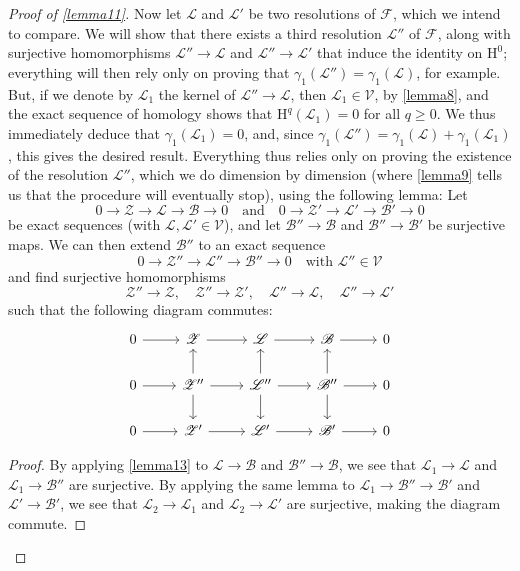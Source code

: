 \documentclass{article}
\theoremstyle{plain}
\newenvironment{lemma}[1]
    {\renewcommand\theinnercustomlemma{#1}\innercustomlemma}
    {\endinnercustomlemma}
\theoremstyle{definition}
\newcommand{\sh}[1]{{\mathscr{#1}}}
\newcommand{\cat}[1]{{\mathcal{#1}}}
\newcommand{\HH}{\mathrm{H}}
\renewcommand{\geq}{\geqslant}
\newcommand{\oldpage}[1]{\marginpar{\footnotesize$\Big\vert$ \textit{p.~#1}}}
\begin{document}
\begin{proof}[Proof of \cref{lemma11}]
  Now let $\sh{L}$ and $\sh{L}'$ be two resolutions of $\sh{F}$, which we intend to compare.
  We will show that there exists a third resolution $\sh{L}''$ of $\sh{F}$, along with surjective homomorphisms $\sh{L}''\to\sh{L}$ and $\sh{L}''\to\sh{L}'$ that induce the identity on $\HH^0$;
  everything will then rely only on proving that $\gamma_1(\sh{L}'')=\gamma_1(\sh{L})$, for example.
  But, if we denote by $\sh{L}_1$ the kernel of $\sh{L}''\to\sh{L}$, then $\sh{L}_1\in\cat{V}$, by \cref{lemma8}, and the exact sequence of homology shows that $\HH^q(\sh{L}_1)=0$ for all $q\geq0$.
  We thus immediately deduce that $\gamma_1(\sh{L}_1)=0$, and, since $\gamma_1(\sh{L}'')=\gamma_1(\sh{L})+\gamma_1(\sh{L}_1)$, this gives the desired result.
  Everything thus relies only on proving the existence of the resolution $\sh{L}''$, which we do dimension by dimension (where \cref{lemma9} tells us that the procedure will eventually stop), using the following lemma:
  \begin{lemma}{14}
  \label{lemma14}
    Let
    \[
      0\to\sh{Z}\to\sh{L}\to\sh{B}\to0
      \quad\text{and}\quad
      0\to\sh{Z}'\to\sh{L}'\to\sh{B}'\to0
    \]
    be exact sequences (with $\sh{L},\sh{L}'\in\cat{V}$), and let $\sh{B}''\to\sh{B}$ and $\sh{B}''\to\sh{B}'$ be surjective maps.
    We can then extend $\sh{B}''$ to an exact sequence
    \[
      0\to\sh{Z}''\to\sh{L}''\to\sh{B}''\to0
      \quad
      \mbox{with $\sh{L}''\in\cat{V}$}
    \]
    and find surjective homomorphisms
    \[
      \sh{Z}''\to\sh{Z},
      \quad
      \sh{Z}''\to\sh{Z}',
      \quad
      \sh{L}''\to\sh{L},
      \quad
      \sh{L}''\to\sh{L}'
    \]
    such that the following diagram commutes:
    \[
      \begin{tikzcd}
        0 \rar
        & \sh{Z} \rar
        & \sh{L} \rar
        & \sh{B} \rar
        & 0
      \\0 \rar
        & \sh{Z}'' \rar \uar \dar
        & \sh{L}'' \rar \uar \dar
        & \sh{B}'' \rar \uar \dar
        & 0
      \\0 \rar
        & \sh{Z}' \rar
        & \sh{L}' \rar
        & \sh{B}' \rar
        & 0
      \end{tikzcd}
    \]
  \end{lemma}
  \begin{proof}
\oldpage{108}
    By applying \cref{lemma13} to $\sh{L}\to\sh{B}$ and $\sh{B}''\to\sh{B}$, we see that $\sh{L}_1\to\sh{L}$ and $\sh{L}_1\to\sh{B}''$ are surjective.
    By applying the same lemma to $\sh{L}_1\to\sh{B}''\to\sh{B}'$ and $\sh{L}'\to\sh{B}'$, we see that $\sh{L}_2\to\sh{L}_1$ and $\sh{L}_2\to\sh{L}'$ are surjective, making the diagram commute.


\end{proof}
\end{proof}
\end{document}

